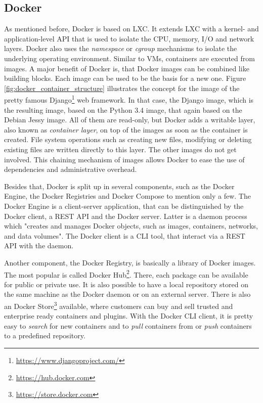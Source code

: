 \subsection{Docker}
As mentioned before, Docker is based on \ac{LXC}.
It extends \ac{LXC} with a kernel- and application-level API that is used to isolate the CPU, memory, I/O and network layers.\autocite[cf.][p. 82]{Bernstein:2014}
Docker also uses the \textit{namespace} or \textit{cgroup} mechanisms to isolate the underlying operating environment.\autocite[cf.][p. 82]{Bernstein:2014}
Similar to \acp{VM}, containers are executed from images.
A major benefit of Docker is, that Docker images can be combined like building blocks.
Each image can be used to be the basis for a new one.
Figure \ref{fig:docker_container_structure} illustrates the concept for the image of the pretty famous Django\footnote{\url{https://www.djangoproject.com/}} web framework.
In that case, the Django image, which is the resulting image, based on the Python 3.4 image, that again based on the Debian Jessy image.
All of them are read-only, but Docker adds a writable layer, also known as \textit{container layer}, on top of the images as soon as the container is created.
File system operations such as creating new files, modifying or deleting existing files are written directly to this layer.\autocite[cf.]{dockerImages}
The other images do not get involved.
This chaining mechanism of images allows Docker to ease the use of dependencies and administrative overhead.

Besides that, Docker is split up in several components, such as the Docker Engine, the Docker Registries and Docker Compose to mention only a few.
The Docker Engine is a client-server application, that can be distinguished by the Docker client, a \ac{REST} \ac{API} and the Docker server.
Latter is a daemon process which "creates and manages Docker objects, such as images, containers, networks, and data volumes"\autocite{dockerEngine}.
The Docker client is a \ac{CLI} tool, that interact via a \ac{REST} \ac{API} with the daemon.\autocite[cf.]{dockerEngine}

Another component, the Docker Registry, is basically a library of Docker images.
The most popular is called Docker Hub\footnote{\url{https://hub.docker.com}}.
There, each package can be available for public or private use.
It is also possible to have a local repository stored on the same machine as the Docker daemon or on an external server.\autocite[cf.]{dockerEngine}
There is also an Docker Store\footnote{\url{https://store.docker.com}} available, where customers can buy and sell trusted and enterprise ready containers and plugins.
With the Docker \ac{CLI} client, it is pretty easy to \textit{search} for new containers and to \textit{pull} containers from or \textit{push} containers to a predefined repository.

